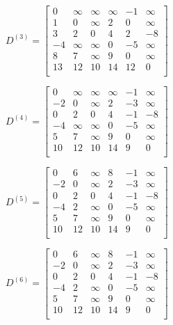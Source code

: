 \documentclass[a4paper, 11pt]{article}
\begin{document}
$D^{(3)} = \begin{bmatrix} 
0 & \infty & \infty & \infty & -1 & \infty\\
1 & 0 & \infty & 2 & 0 & \infty\\
3 & 2 & 0 & 4 & 2 & -8\\
-4 & \infty & \infty & 0 & -5 & \infty\\
8 & 7 & \infty & 9 & 0 & \infty\\
13 & 12 & 10 & 14 & 12 & 0\\
\end{bmatrix}$ 

$D^{(4)} = \begin{bmatrix} 
0 & \infty & \infty & \infty & -1 & \infty\\
-2 & 0 & \infty & 2 & -3 & \infty\\
0 & 2 & 0 & 4 & -1 & -8\\
-4 & \infty & \infty & 0 & -5 & \infty\\
5 & 7 & \infty & 9 & 0 & \infty\\
10 & 12 & 10 & 14 & 9 & 0\\
\end{bmatrix}$ 

$D^{(5)} = \begin{bmatrix} 
0 & 6 & \infty & 8 & -1 & \infty\\
-2 & 0 & \infty & 2 & -3 & \infty\\
0 & 2 & 0 & 4 & -1 & -8\\
-4 & 2 & \infty & 0 & -5 & \infty\\
5 & 7 & \infty & 9 & 0 & \infty\\
10 & 12 & 10 & 14 & 9 & 0\\
\end{bmatrix}$ 

$D^{(6)} = \begin{bmatrix} 
0 & 6 & \infty & 8 & -1 & \infty\\
-2 & 0 & \infty & 2 & -3 & \infty\\
0 & 2 & 0 & 4 & -1 & -8\\
-4 & 2 & \infty & 0 & -5 & \infty\\
5 & 7 & \infty & 9 & 0 & \infty\\
10 & 12 & 10 & 14 & 9 & 0\\
\end{bmatrix}$ 



\end{document}
